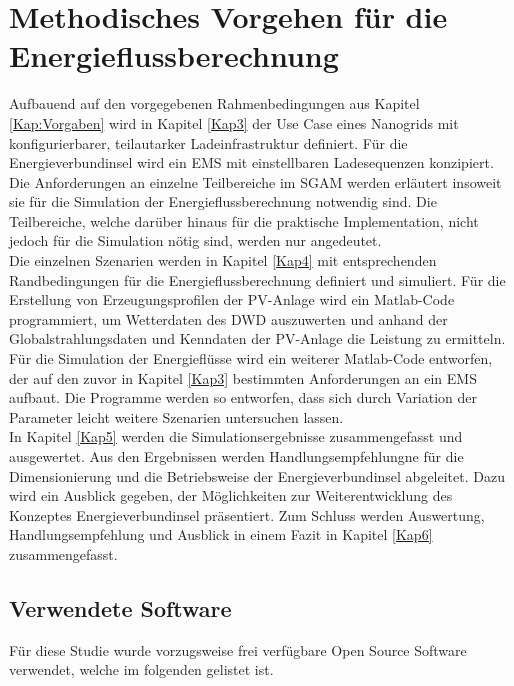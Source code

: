 \section{Methodisches Vorgehen für die Energieflussberechnung}
	Aufbauend auf den vorgegebenen Rahmenbedingungen aus Kapitel \ref{Kap:Vorgaben} wird in Kapitel \ref{Kap3} der Use Case eines Nanogrids mit konfigurierbarer, teilautarker Ladeinfrastruktur definiert. Für die Energieverbundinsel wird ein EMS mit einstellbaren Ladesequenzen konzipiert. Die Anforderungen an einzelne Teilbereiche im SGAM werden erläutert insoweit sie für die Simulation der Energieflussberechnung notwendig sind. Die Teilbereiche, welche darüber hinaus für die praktische Implementation, nicht jedoch für die Simulation nötig sind, werden nur angedeutet.\\

	Die einzelnen Szenarien werden in Kapitel \ref{Kap4} mit entsprechenden Randbedingungen für die Energieflussberechnung definiert und simuliert. Für die Erstellung von Erzeugungsprofilen der PV-Anlage wird ein Matlab-Code programmiert, um Wetterdaten des DWD auszuwerten und anhand der Globalstrahlungsdaten und Kenndaten der PV-Anlage die Leistung zu ermitteln. Für die Simulation der Energieflüsse wird ein weiterer Matlab-Code entworfen, der auf den zuvor in Kapitel \ref{Kap3} bestimmten Anforderungen an ein EMS aufbaut. Die Programme werden so entworfen, dass sich durch Variation der Parameter leicht weitere Szenarien untersuchen lassen. \\

	In Kapitel \ref{Kap5} werden die Simulationsergebnisse zusammengefasst und ausgewertet. Aus den Ergebnissen werden Handlungsempfehlungne für die Dimensionierung und die Betriebsweise der Energieverbundinsel abgeleitet. Dazu wird ein Ausblick gegeben, der Möglichkeiten zur Weiterentwicklung des Konzeptes Energieverbundinsel präsentiert. Zum Schluss werden Auswertung, Handlungsempfehlung und Ausblick in einem Fazit in Kapitel \ref{Kap6} zusammengefasst.

	\subsection{Verwendete Software}
		Für diese Studie wurde vorzugsweise frei verfügbare Open Source Software verwendet, welche im folgenden gelistet ist.
	
